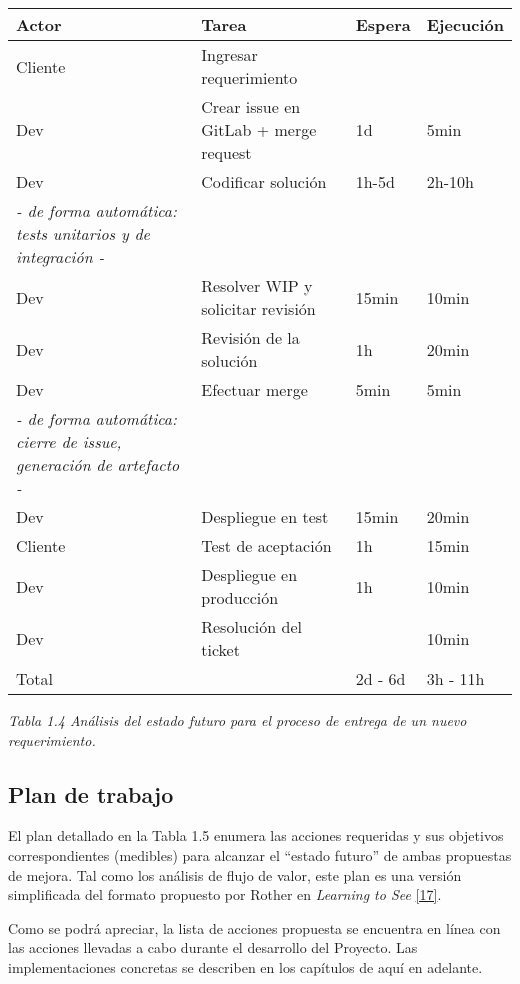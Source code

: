 \begin{tabular}{|l|l|l|l|}
\hline
Actor & Tarea & Espera & Ejecución \\ \hline
Cliente & Ingresar requerimiento &  &  \\ \hline
Dev & Crear issue en GitLab + merge request & 1d & 5min \\ \hline
Dev & Codificar solución & 1h-5d & 2h-10h \\ \hline
\textit{- de forma automática: tests unitarios y de integración -} &  &  &  \\ \hline
Dev & Resolver WIP y solicitar revisión & 15min & 10min \\ \hline
Dev & Revisión de la solución & 1h & 20min \\ \hline
Dev & Efectuar merge & 5min & 5min \\ \hline
\textit{- de forma automática: cierre de issue, generación de artefacto -} &  &  &  \\ \hline
Dev & Despliegue en test & 15min & 20min \\ \hline
Cliente & Test de aceptación & 1h & 15min \\ \hline
Dev & Despliegue en producción & 1h & 10min \\ \hline
Dev & Resolución del ticket &  & 10min \\ \hline
Total &  & 2d - 6d & 3h - 11h \\ \hline
\end{tabular}
\textit{Tabla 1.4 Análisis del estado futuro para el proceso de entrega de un nuevo requerimiento.}

\subsection{Plan de trabajo}

El plan detallado en la Tabla 1.5 enumera las acciones requeridas y sus objetivos correspondientes (medibles) para alcanzar el “estado futuro” de ambas propuestas de mejora. Tal como los análisis de flujo de valor, este plan es una versión simplificada del formato propuesto por Rother en \textit{Learning to See} \href{https://www.zotero.org/google-docs/?3lDhJE}{[17]}.

Como se podrá apreciar, la lista de acciones propuesta se encuentra en línea con las acciones llevadas a cabo durante el desarrollo del Proyecto. Las implementaciones concretas se describen en los capítulos de aquí en adelante.

